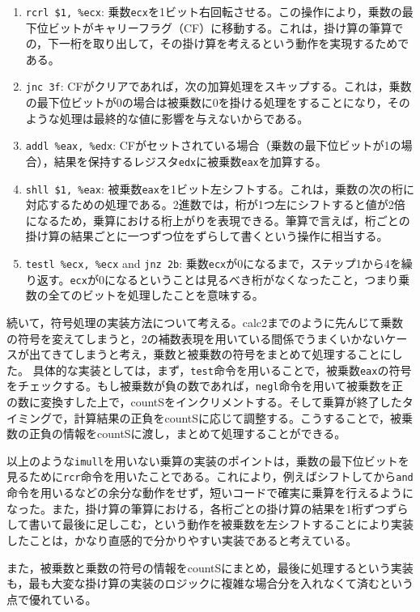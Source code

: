 \documentclass[a4paper]{jsarticle}
\newcommand{\var}[1]{\texttt{#1}}
\begin{document}
\begin{enumerate}
    \item \var{rcrl \$1, \%ecx}: 乗数\var{ecx}を1ビット右回転させる。この操作により，乗数の最下位ビットがキャリーフラグ（CF）に移動する。これは，掛け算の筆算での，下一桁を取り出して，その掛け算を考えるという動作を実現するためである。
    \item \var{jnc 3f}: CFがクリアであれば，次の加算処理をスキップする。これは，乗数の最下位ビットが0の場合は被乗数に0を掛ける処理をすることになり，そのような処理は最終的な値に影響を与えないからである。
    \item \var{addl \%eax, \%edx}: CFがセットされている場合（乗数の最下位ビットが1の場合），結果を保持するレジスタ\var{edx}に被乗数\var{eax}を加算する。
    \item \var{shll \$1, \%eax}: 被乗数\var{eax}を1ビット左シフトする。これは，乗数の次の桁に対応するための処理である。2進数では，桁が1つ左にシフトすると値が2倍になるため，乗算における桁上がりを表現できる。筆算で言えば，桁ごとの掛け算の結果ごとに一つずつ位をずらして書くという操作に相当する。
    \item \var{testl \%ecx, \%ecx} and \var{jnz 2b}: 乗数\var{ecx}が0になるまで，ステップ1から4を繰り返す。\var{ecx}が0になるということは見るべき桁がなくなったこと，つまり乗数の全てのビットを処理したことを意味する。
\end{enumerate}

続いて，符号処理の実装方法について考える。calc2までのように先んじて乗数の符号を変えてしまうと，2の補数表現を用いている間係でうまくいかないケースが出てきてしまうと考え，乗数と被乗数の符号をまとめて処理することにした。
具体的な実装としては，まず，\var{test}命令を用いることで，被乗数\var{eax}の符号をチェックする。もし被乗数が負の数であれば，\var{negl}命令を用いて被乗数を正の数に変換すした上で，countSをインクリメントする。そして乗算が終了したタイミングで，計算結果の正負をcountSに応じて調整する。こうすることで，被乗数の正負の情報をcountSに渡し，まとめて処理することができる。

以上のような\var{imull}を用いない乗算の実装のポイントは，乗数の最下位ビットを見るために\var{rcr}命令を用いたことである。これにより，例えばシフトしてから\var{and}命令を用いるなどの余分な動作をせず，短いコードで確実に乗算を行えるようになった。また，掛け算の筆算における，各桁ごとの掛け算の結果を1桁ずつずらして書いて最後に足しこむ，という動作を被乗数を左シフトすることにより実装したことは，かなり直感的で分かりやすい実装であると考えている。

また，被乗数と乗数の符号の情報をcountSにまとめ，最後に処理するという実装も，最も大変な掛け算の実装のロジックに複雑な場合分を入れなくて済むという点で優れている。
\end{document}
